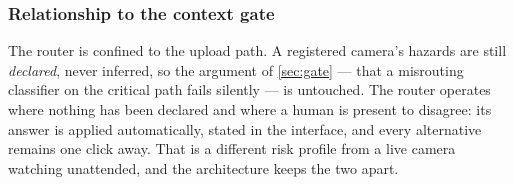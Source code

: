 \subsubsection{Relationship to the context gate}

The router is confined to the upload path. A registered camera's hazards are
still \emph{declared}, never inferred, so the argument of \cref{sec:gate} —
that a misrouting classifier on the critical path fails silently — is
untouched. The router operates where nothing has been declared and where a
human is present to disagree: its answer is applied automatically, stated in
the interface, and every alternative remains one click away. That is a
different risk profile from a live camera watching unattended, and the
architecture keeps the two apart.
